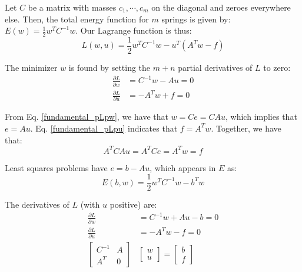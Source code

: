 \documentclass[]{article}
\begin{document}
Let $C$ be a matrix with masses $c_1, \dotsm, c_m$ on the diagonal and zeroes everywhere else. Then, the total energy function for $m$ springs is given by: $E(w) = \frac{1}{2}w^T C^{-1} w$. Our Lagrange function is thus:
\begin{equation}
L(w, u) = \frac{1}{2}w^T C^{-1} w - u^{T}(A^{T}w - f)
\end{equation}

The minimizer $w$ is found by setting the $m+n$ partial derivatives of $L$ to zero:
\begin{align}
\frac{\partial L}{\partial w} &= C^{-1}w - Au = 0 \label{fundamental_pLpw}\\
\frac{\partial L}{\partial u} &= -A^{T}w + f = 0 \label{fundamental_pLpu}
\end{align}

From Eq. \ref{fundamental_pLpw}, we have that $w = Ce = CAu$, which implies that $e = Au$. Eq. \ref{fundamental_pLpu} indicates that $f = A^{T}w$. Together, we have that:
\begin{equation}
A^T C A u = A^T C e = A^T w = f
\end{equation}

Least squares problems have $e = b - Au$, which appears in $E$ as:
\begin{equation*}
E(b, w) = \frac{1}{2}w^T C^{-1} w - b^T w
\end{equation*}

The derivatives of $L$ (with $u$ positive) are:
\begin{align}
\frac{\partial L}{\partial w} &= C^{-1}w + Au - b = 0 \\
\frac{\partial L}{\partial u} &= -A^{T}w - f = 0 \\
\begin{bmatrix}
C^{-1} & A \\ A^{T} & 0 
\end{bmatrix} &\begin{bmatrix}
w \\ u
\end{bmatrix} = \begin{bmatrix}
b \\ f
\end{bmatrix}
\end{align}
\end{document}
